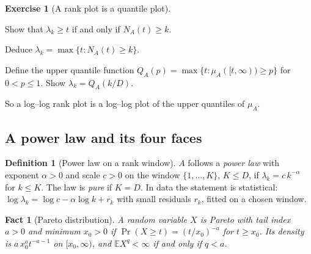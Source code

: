 \documentclass[11pt,a4paper]{article}
\newcommand{\E}{\mathbb{E}}
\theoremstyle{plain}
\newtheorem{fact}[proposition]{Fact}
\theoremstyle{definition}
\newtheorem{definition}[proposition]{Definition}
\newtheorem{exercise}[proposition]{Exercise}
\theoremstyle{remark}
\begin{document}
\begin{exercise}[A rank plot is a quantile plot]\label{ex:quantile}
\begin{steps}
\item\label{st:quantile-a} Show that $\lambda_k\ge t$ if and only if $N_A(t)\ge k$.
\item\label{st:quantile-b} Deduce $\lambda_k=\max\{t:N_A(t)\ge k\}$.
\item Define the upper quantile function $Q_A(p)=\max\{t:\mu_A([t,\infty))\ge p\}$ for $0<p\le1$. Show
  $\lambda_k=Q_A(k/D)$.
\end{steps}
So a log--log rank plot is a log--log plot of the upper quantiles of $\mu_A$.
\end{exercise}

\subsection{A power law and its four faces}

\begin{definition}[Power law on a rank window]\label{def:law}
$A$ follows a \emph{power law} with exponent $\alpha>0$ and scale $c>0$ on the window $\{1,\dots,K\}$, $K\le D$, if
$\lambda_k=c\,k^{-\alpha}$ for $k\le K$. The law is \emph{pure} if $K=D$. In data the statement is statistical:
$\log\lambda_k=\log c-\alpha\log k+r_k$ with small residuals $r_k$, fitted on a chosen window.
\end{definition}

\begin{fact}[Pareto distribution]\label{fact:pareto}
A random variable $X$ is Pareto with \emph{tail index} $a>0$ and minimum $x_0>0$ if $\Pr(X\ge t)=(t/x_0)^{-a}$ for
$t\ge x_0$. Its density is $a\,x_0^at^{-a-1}$ on $[x_0,\infty)$, and $\E X^q<\infty$ if and only if $q<a$.
\end{fact}
\end{document}
